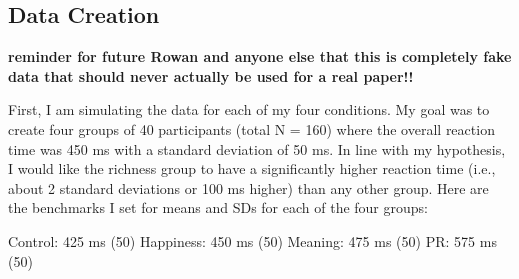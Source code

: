 \documentclass[
]{article}
\begin{document}
\hypertarget{data-creation}{%
\subsection{Data Creation}\label{data-creation}}

\textbf{reminder for future Rowan and anyone else that this is
completely fake data that should never actually be used for a real
paper!!}

First, I am simulating the data for each of my four conditions. My goal
was to create four groups of 40 participants (total N = 160) where the
overall reaction time was 450 ms with a standard deviation of 50 ms. In
line with my hypothesis, I would like the richness group to have a
significantly higher reaction time (i.e., about 2 standard deviations or
100 ms higher) than any other group. Here are the benchmarks I set for
means and SDs for each of the four groups:

Control: 425 ms (50) Happiness: 450 ms (50) Meaning: 475 ms (50) PR: 575
ms (50)
\end{document}
